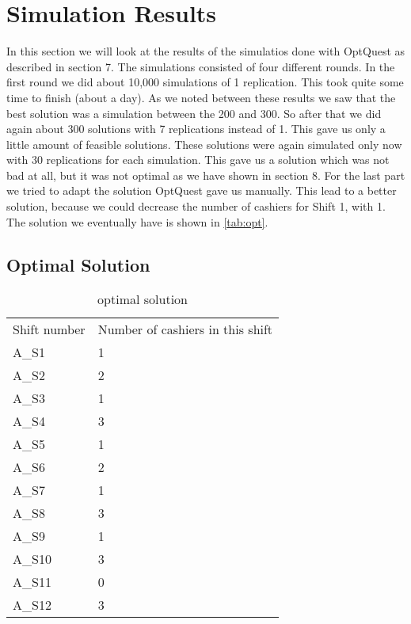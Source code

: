 \section{Simulation Results}
In this section we will look at the results of the simulatios done with OptQuest as described in section 7. 
The simulations consisted of four different rounds. 
In the first round we did about 10,000 simulations of 1 replication. 
This took quite some time to finish (about a day).
As we noted between these results we saw that the best solution was a simulation between the 200 and 300.
So after that we did again about 300 solutions with 7 replications instead of 1.
This gave us only a little amount of feasible solutions. 
These solutions were again simulated only now with 30 replications for each simulation.
This gave us a solution which was not bad at all, but it was not optimal as we have shown in section 8.
For the last part we tried to adapt the solution OptQuest gave us manually.
This lead to a better solution, because we could decrease the number of cashiers for Shift 1, with 1.
The solution we eventually have is shown in \autoref{tab:opt}.\\

\subsection{Optimal Solution}
\begin{table}
	\centering
	\caption{optimal solution}
	\begin{tabular}{l | l}
		Shift number & Number of cashiers in this shift\\
		A\_S1 & 1 \\
		A\_S2 & 2 \\
		A\_S3 & 1 \\
		A\_S4 & 3 \\
		A\_S5 & 1 \\
		A\_S6 & 2 \\
		A\_S7 & 1 \\
		A\_S8 & 3 \\
		A\_S9 & 1 \\
		A\_S10 & 3 \\
		A\_S11 & 0 \\
		A\_S12 & 3 \\
	\end{tabular}
	\label{tab:opt}
\end{table}

\newcommand{\cc}{\cellcolor{cyan}}

